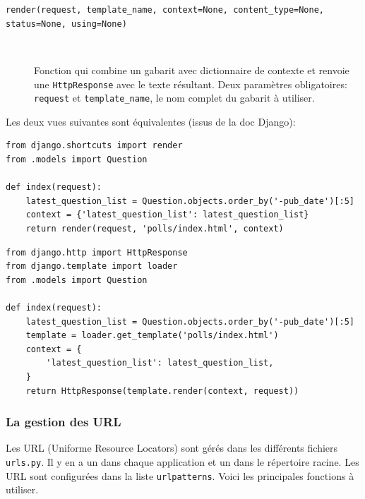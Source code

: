 \documentclass[a4paper, 10pt]{article}
\begin{document}
\begin{description}
    \item[\texttt{render(request, template_name, context=None, content_type=None, status=None, using=None)}]~

          Fonction qui combine un gabarit avec dictionnaire de contexte et renvoie une \texttt{HttpResponse} avec le texte résultant. Deux paramètres obligatoires: \texttt{request} et \texttt{template_name}, le nom complet du gabarit à utiliser.
\end{description}

Les deux vues suivantes sont équivalentes (issus de la doc
Django):
\begin{verbatim}
from django.shortcuts import render
from .models import Question

def index(request):
    latest_question_list = Question.objects.order_by('-pub_date')[:5]
    context = {'latest_question_list': latest_question_list}
    return render(request, 'polls/index.html', context)
\end{verbatim}

\begin{verbatim}
from django.http import HttpResponse
from django.template import loader
from .models import Question

def index(request):
    latest_question_list = Question.objects.order_by('-pub_date')[:5]
    template = loader.get_template('polls/index.html')
    context = {
        'latest_question_list': latest_question_list,
    }
    return HttpResponse(template.render(context, request))
\end{verbatim}


\subsubsection{La gestion des URL}
Les URL  (Uniforme Resource Locators) sont gérés dans les différents fichiers \texttt{urls.py}. Il y en a un dans chaque application et un dans le répertoire racine. Les URL sont configurées dans la liste \texttt{urlpatterns}. Voici les principales fonctions à utiliser.
\end{document}
